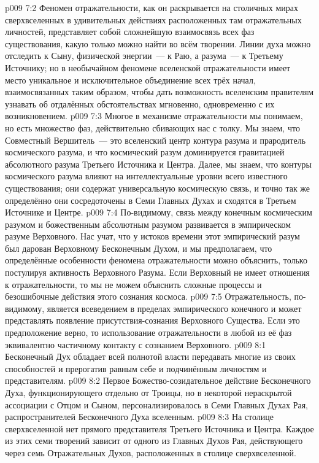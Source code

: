 \vs p009 7:2 Феномен отражательности, как он раскрывается на столичных мирах сверхвселенных в удивительных действиях расположенных там отражательных личностей, представляет собой сложнейшую взаимосвязь всех фаз существования, какую только можно найти во всём творении. Линии духа можно отследить к Сыну, физической энергии~--- к Раю, а разума~--- к Третьему Источнику; но в необычайном феномене вселенской отражательности имеет место уникальное и исключительное объединение всех трёх начал, взаимосвязанных таким образом, чтобы дать возможность вселенским правителям узнавать об отдалённых обстоятельствах мгновенно, одновременно с их возникновением.
\vs p009 7:3 Многое в механизме отражательности мы понимаем, но есть множество фаз, действительно сбивающих нас с толку. Мы знаем, что Совместный Вершитель~--- это вселенский центр контура разума и прародитель космического разума, и что космический разум доминируется гравитацией абсолютного разума Третьего Источника и Центра. Далее, мы знаем, что контуры космического разума влияют на интеллектуальные уровни всего известного существования; они содержат универсальную космическую связь, и точно так же определённо они сосредоточены в Семи Главных Духах и сходятся в Третьем Источнике и Центре.
\vs p009 7:4 \pc По\hyp{}видимому, связь между конечным космическим разумом и божественным абсолютным разумом развивается в эмпирическом разуме Верховного. Нас учат, что у истоков времени этот эмпирический разум был дарован Верховному Бесконечным Духом, и мы предполагаем, что определённые особенности феномена отражательности можно объяснить, только постулируя активность Верховного Разума. Если Верховный не имеет отношения к отражательности, то мы не можем объяснить сложные процессы и безошибочные действия этого сознания космоса.
\vs p009 7:5 Отражательность, по\hyp{}видимому, является всеведением в пределах эмпирического конечного и может представлять появление присутствия\hyp{}сознания Верховного Существа. Если это предположение верно, то использование отражательности в любой из её фаз эквивалентно частичному контакту с сознанием Верховного.
\vs p009 8:1 Бесконечный Дух обладает всей полнотой власти передавать многие из своих способностей и прерогатив равным себе и подчинённым личностям и представителям.
\vs p009 8:2 Первое Божество\hyp{}созидательное действие Бесконечного Духа, функционирующего отдельно от Троицы, но в некоторой нераскрытой ассоциации с Отцом и Сыном, персонализировалось в Семи Главных Духах Рая, распространителей Бесконечного Духа вселенным.
\vs p009 8:3 На столице сверхвселенной нет прямого представителя Третьего Источника и Центра. Каждое из этих семи творений зависит от одного из Главных Духов Рая, действующего через семь Отражательных Духов, расположенных в столице сверхвселенной.
